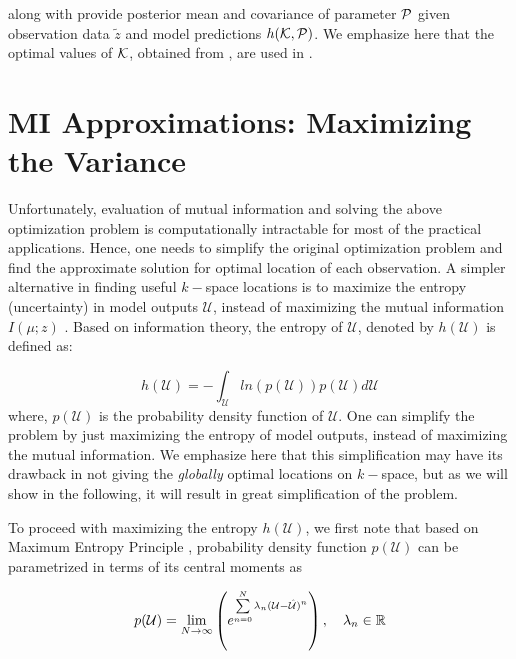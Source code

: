 \documentclass{article}         %
\theoremstyle{definition}
\theoremstyle{remark}
\begin{document}
 along with  provide posterior mean and covariance of parameter $\mathcal{P}$ given observation data $\tilde{z}$ and model predictions $h(\mathcal{K},\mathcal{P})$.
We emphasize here that the optimal values of $\mathcal{K}$, obtained from , are used in .

\section{MI Approximations: Maximizing the Variance}


Unfortunately, evaluation of mutual information and solving the above
optimization problem is computationally intractable for most of the practical
applications. Hence, one needs to simplify the original optimization problem
and find the approximate solution for optimal location of each observation. A
simpler alternative in finding useful $k-$space locations is to maximize the
entropy (uncertainty) in model outputs $\mathcal{U}$, instead of maximizing the
mutual information $I(\mu;z)$ \cite{krause2008}. Based on information theory,
the entropy of $\mathcal{U}$, denoted by $h(\mathcal{U})$ is defined as:
%

\begin{equation}\label{entropy}
h(\mathcal{U})=-\int_{\mathcal{U}} ln\left(p(\mathcal{U})\right)p(\mathcal{U})d\mathcal{U}
\end{equation}
where, $p(\mathcal{U})$ is the probability density function of $\mathcal{U}$. %
One can simplify the problem by just maximizing the entropy of model outputs,
instead of maximizing the mutual information. We emphasize here that this
simplification may have its drawback in not giving the \textit{globally}
optimal locations on $k-$space, but as we will show in the following, it will
result in great simplification of the problem. 

To proceed with maximizing the entropy $h(\mathcal{U})$, we first note that
based on Maximum Entropy Principle \cite{cover2012elements}, probability
density function $p(\mathcal{U})$ can be parametrized in terms of its central
moments as

\begin{equation}\label{pu_entropy}
p(\mathcal{U})=\lim_{N\rightarrow \infty} \left(e^{\sum\limits_{n=0}^N \lambda_n (\mathcal{U}-\hat{\mathcal{U}})^n}\right),\quad \lambda_n \in \mathbb R
\end{equation}
\end{document}
